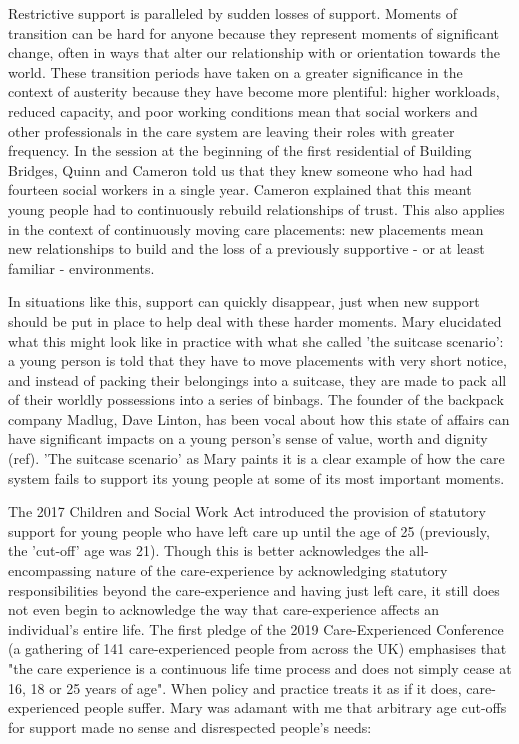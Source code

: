 Restrictive support is paralleled by sudden losses of support. Moments of transition can be hard for anyone because they represent moments of significant change, often in ways that alter our relationship with or orientation towards the world. These transition periods have taken on a greater significance in the context of austerity because they have become more plentiful: higher workloads, reduced capacity, and poor working conditions mean that social workers and other professionals in the care system are leaving their roles with greater frequency. In the session at the beginning of the first residential of Building Bridges, Quinn and Cameron told us that they knew someone who had had fourteen social workers in a single year. Cameron explained that this meant young people had to continuously rebuild relationships of trust. This also applies in the context of continuously moving care placements: new placements mean new relationships to build and the loss of a previously supportive - or at least familiar - environments.

In situations like this, support can quickly disappear, just when new support should be put in place to help deal with these harder moments. Mary elucidated what this might look like in practice with what she called 'the suitcase scenario': a young person is told that they have to move placements with very short notice, and instead of packing their belongings into a suitcase, they are made to pack all of their worldly possessions into a series of binbags. The founder of the backpack company Madlug, Dave Linton, has been vocal about how this state of affairs can have significant impacts on a young person's sense of value, worth and dignity (ref). 'The suitcase scenario' as Mary paints it is a clear example of how the care system fails to support its young people at some of its most important moments.

The 2017 Children and Social Work Act introduced the provision of statutory support for young people who have left care up until the age of 25 (previously, the 'cut-off' age was 21). Though this is better acknowledges the all-encompassing nature of the care-experience by acknowledging statutory responsibilities beyond the care-experience and having just left care, it still does not even begin to acknowledge the way that care-experience affects an individual's entire life. The first pledge of the 2019 Care-Experienced Conference (a gathering of 141 care-experienced people from across the UK) emphasises that "the care experience is a continuous life time process and does not simply cease at 16, 18 or 25 years of age". When policy and practice treats it as if it does, care-experienced people suffer. Mary was adamant with me that arbitrary age cut-offs for support made no sense and disrespected people's needs:

